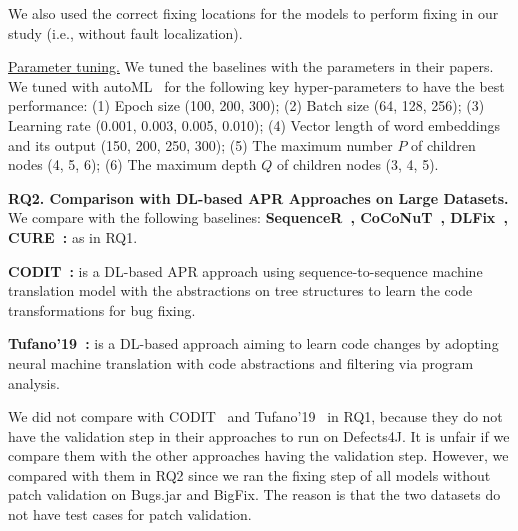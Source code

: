 
We also used the correct fixing locations for the models to perform
fixing in our study (i.e., without fault localization).



\underline{Parameter tuning.} We tuned the baselines with the
parameters in their papers.
We tuned {\tool} with autoML~\cite{NNI} for the following key
hyper-parameters to have the best performance: (1) Epoch size (100,
200, 300); (2) Batch size (64, 128, 256); (3) Learning rate (0.001,
0.003, 0.005, 0.010); (4) Vector length of word embeddings and its
output (150, 200, 250, 300); (5) The maximum number $P$ of children
nodes (4, 5, 6); (6) The maximum depth $Q$ of children nodes (3, 4,
5).

{\bf RQ2. Comparison with DL-based APR Approaches on
  Large Datasets.} We compare {\tool} with the following baselines:
{\bf Sequen\-ceR~\cite{chen2018sequencer},
  CoCoNuT~\cite{lutellier2020coconut}, DLFix~\cite{icse20},
  CURE~\cite{cure-icse21}:} as in RQ1.

{\bf CODIT~\cite{chakrabortycodit}:} is a DL-based APR approach
using sequence-to-sequence machine translation model with the
abstractions on tree structures to learn the code transformations for
bug fixing.

{\bf Tufano'19~\cite{tufano2019learning}:} is a DL-based approach
aiming to learn code changes by adopting neural machine translation
with code abstractions and filtering via program analysis.

We did not compare with CODIT~\cite{chakrabortycodit} and
Tufano'19~\cite{tufano2019learning} in RQ1, because they do not have
the validation step in their approaches to run on Defects4J. It is
unfair if we compare them with the other approaches having the
validation step. However, we compared {\tool} with them in RQ2 since
we ran the fixing step of all models without patch validation on
Bugs.jar and BigFix. The reason is that the two datasets do not have
test cases for patch validation.

